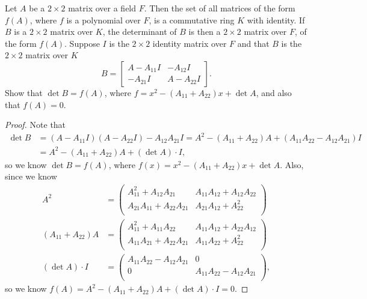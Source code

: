 \begin{problem}
Let $A$ be a $2 \times 2$ matrix over a field $F$. Then the set of all matrices of the form $f(A)$, where $f$ is a polynomial over $F$, is a commutative ring $K$ with identity. If $B$ is a $2 \times 2$ matrix over $K$, the determinant of $B$ is then a $2 \times 2$ matrix over $F$, of the form $f(A)$. Suppose $I$ is the $2 \times 2$ identity matrix over $F$ and that $B$ is the $2 \times 2$ matrix over $K$
\[
B = 
\begin{bmatrix}
A - A_{11}I & -A_{12}I \\
-A_{21}I & A - A_{22}I
\end{bmatrix}.
\]
Show that $\det B = f(A)$, where $f = x^2 - (A_{11} + A_{22})x + \det A$, and also that $f(A) = 0$.
\end{problem}
\begin{proof}
    Note that 
    \begin{align*}
        \det B &= (A - A_{11} I)(A - A_{22} I) - A_{12} A_{21} I = A^2 - (A_{11} + A_{22}  ) A + (A_{11} A_{22} - A_{12} A_{21}  )I \\
        &= A^2 - (A_{11} + A_{22})A + (\det A) \cdot I, 
    \end{align*}
    so we know \(\det B = f(A)\), where \(f(x) = x^2 - (A_{11} + A_{22}  )x + \det A\). Also, since we know 
    \begin{align*}
        A^2 &= \begin{pmatrix}
            A_{11}^2 + A_{12} A_{21} & A_{11} A_{12} + A_{12} A_{22}  \\
            A_{21} A_{11} + A_{22} A_{21} & A_{21} A_{12} + A_{22}^2  \\
        \end{pmatrix} \\
        (A_{11} + A_{22})A &= \begin{pmatrix}
            A_{11}^2 + A_{11}A_{22} & A_{11} A_{12} + A_{22} A_{12}  \\
            A_{11} A_{21} + A_{22} A_{21} & A_{11} A_{22} + A_{22}^2  \\
        \end{pmatrix} \\
        (\det A) \cdot I &= \begin{pmatrix}
            A_{11} A_{22} - A_{12} A_{21}   &  0 \\
            0 & A_{11} A_{22} - A_{12} A_{21}  \\
        \end{pmatrix},
    \end{align*}
    so we know \(f(A) = A^2 - (A_{11} + A_{22})A + (\det A) \cdot I = 0\).   
\end{proof}